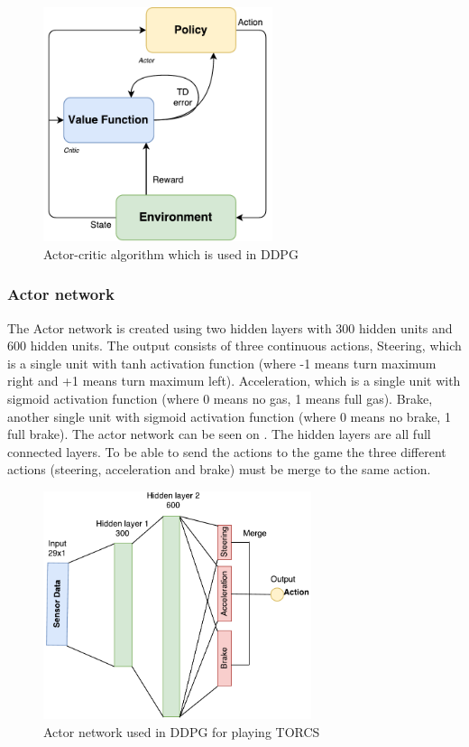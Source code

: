 \begin{figure}[H]
	\centering
	\includegraphics[width=0.6\textwidth]{Figures/Architecture/DDPG/Actor_critic_architecture.pdf}
	\caption{Actor-critic algorithm which is used in DDPG}
	\label{fig:Actor_critic_architecture}
\end{figure}

\subsubsection{Actor network}
The Actor network is created using two hidden layers with 300 hidden units and 600 hidden units. The output consists of three continuous actions, Steering, which is a single unit with tanh activation function (where -1 means turn maximum right and +1 means turn maximum left). Acceleration, which is a single unit with sigmoid activation function (where 0 means no gas, 1 means full gas). Brake, another single unit with sigmoid activation function (where 0 means no brake, 1 full brake). The actor network can be seen on . The hidden layers are all full connected layers. To be able to send the actions to the game the three different actions (steering, acceleration and brake) must be merge to the same action.

\begin{figure}[H]
	\centering
	\includegraphics[width=0.7\textwidth]{Figures/Architecture/DDPG/DDPG_Actor_network.pdf}
	\caption{Actor network used in DDPG for playing TORCS }
	\label{fig:DDPG_Actor_network}
\end{figure}  


